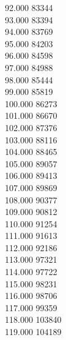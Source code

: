 { 92.000	83344 \\
 93.000	83394 \\
 94.000	83769 \\
 95.000	84203 \\
 96.000	84598 \\
 97.000	84988 \\
 98.000	85444 \\
 99.000	85819 \\
 100.000	86273 \\
 101.000	86670 \\
 102.000	87376 \\
 103.000	88116 \\
 104.000	88465 \\
 105.000	89057 \\
 106.000	89413 \\
 107.000	89869 \\
 108.000	90377 \\
 109.000	90812 \\
 110.000	91254 \\
 111.000	91613 \\
 112.000	92186 \\
 113.000	97321 \\
 114.000	97722 \\
 115.000	98231 \\
 116.000	98706 \\
 117.000	99359 \\
 118.000	103840 \\
 119.000	104189 \\
}
